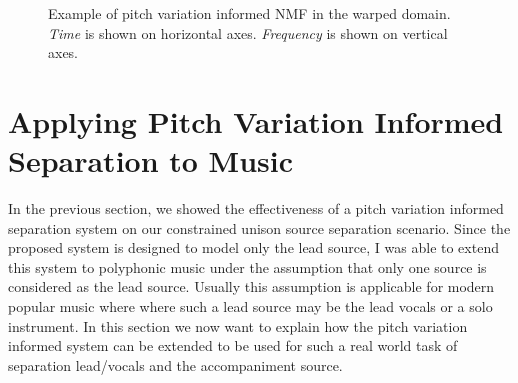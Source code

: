 \begin{figure}[H]
    \hfill

    \hfill
    \caption{Example of pitch variation informed NMF in the warped domain. \textit{Time} is shown on horizontal axes. \textit{Frequency} is shown on vertical axes.}
    \label{fig:warpingdemo}
\end{figure}

\section{Applying Pitch Variation Informed Separation to Music}

In the previous section, we showed the effectiveness of a pitch variation informed separation system on our constrained unison source separation scenario.
Since the proposed system is designed to model only the lead source, I was able to extend this system to polyphonic music under the assumption that only one source is considered as the lead source.
Usually this assumption is applicable for modern popular music where where such a lead source may be the lead vocals or a solo instrument.
In this section we now want to explain how the pitch variation informed system can be extended to be used for such a real world task of separation lead/vocals and the accompaniment source.

